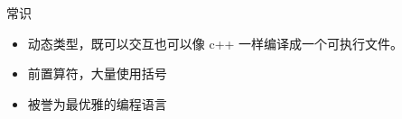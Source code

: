 

\begin{issues}
\issueDraft
\end{issues}

常识
\begin{itemize}
\item 动态类型，既可以交互也可以像 c++ 一样编译成一个可执行文件。
\item 前置算符，大量使用括号
\item 被誉为最优雅的编程语言
\end{itemize}

